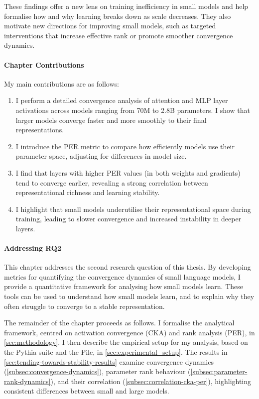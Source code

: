 These findings offer a new lens on training inefficiency in small models and help formalise how and why learning breaks down as scale decreases. They also motivate new directions for improving small models, such as targeted interventions that increase effective rank or promote smoother convergence dynamics.

\paragraph{Chapter Contributions}
My main contributions are as follows:
\begin{enumerate}
    \item I perform a detailed convergence analysis of attention and MLP layer activations across models ranging from 70M to 2.8B parameters. I show that larger models converge faster and more smoothly to their final representations.

    \item I introduce the PER metric to compare how efficiently models use their parameter space, adjusting for differences in model size.

    \item I find that layers with higher PER values (in both weights and gradients) tend to converge earlier, revealing a strong correlation between representational richness and learning stability.

    \item I highlight that small models underutilise their representational space during training, leading to slower convergence and increased instability in deeper layers.
\end{enumerate}

\paragraph{Addressing RQ2} This chapter addresses the second research question of this thesis. By developing metrics for quantifying the convergence dynamics of small language models, I provide a quantitative framework for analysing how small models learn. These tools can be used to understand how small models learn, and to explain why they often struggle to converge to a stable representation.

\vspace{1em}

The remainder of the chapter proceeds as follows. I formalise the analytical framework, centred on activation convergence (CKA) and rank analysis (PER), in \cref{sec:methodology}. I then describe the empirical setup for my analysis, based on the Pythia suite and the Pile, in \cref{sec:experimental_setup}. The results in \cref{sec:tending-towards-stability-results} examine convergence dynamics (\cref{subsec:convergence-dynamics}), parameter rank behaviour (\cref{subsec:parameter-rank-dynamics}), and their correlation (\cref{subsec:correlation-cka-per}), highlighting consistent differences between small and large models.

